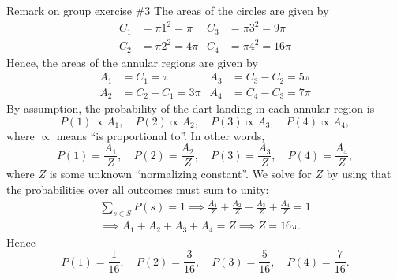 \documentclass[10pt]{beamer}
\begin{document}
\begin{frame}{Remark on group exercise \#3}
\footnotesize  
The areas of the circles are given by
%
\begin{align*}
C_1 &= \pi 1^2 = \pi   &  C_3 &= \pi 3^2 = 9 \pi  \\
C_2 &= \pi 2^2 = 4 \pi   &  C_4 &= \pi 4^2 = 16 \pi  
\end{align*}
%
Hence, the areas of the annular regions are given by 
%
\begin{align*}
A_1 &= C_1 = \pi  & A_3 &= C_3 - C_2 = 5 \pi  \\
A_2 &= C_2 - C_1 = 3 \pi  & A_4 &= C_4 - C_3 = 7 \pi  
\end{align*}
%
By assumption, the probability of the dart landing in each annular region is
\[ P(1) \propto A_1, \quad P(2) \propto A_2, \quad P(3) \propto A_3, \quad P(4) \propto A_4,\] 
where $\propto$ means \enquote{is proportional to}.  In other words,
\[ P(1) = \frac{A_1}{Z}, \quad P(2) = \frac{A_2}{Z}, \quad P(3) = \frac{A_3}{Z}, \quad P(4) = \frac{A_4}{Z},\]
where $Z$ is some unknown \enquote{normalizing constant}.  We solve for $Z$ by using that the probabilities over all outcomes must sum to unity: 
%
\begin{align*}
\sum_{s \in S} P(s) = 1  \implies \frac{A_1}{Z} + \frac{A_2}{Z} + \frac{A_3}{Z} + \frac{A_4}{Z}  = 1 \\
\implies A_1 + A_2 + A_3 + A_4 = Z  \implies Z = 16 \pi. 
\end{align*} 
%
Hence
\[ P(1) = \frac{1}{16}, \quad P(2) = \frac{3}{16}, \quad P(3) = \frac{5}{16}, \quad P(4) = \frac{7}{16}.\]
\end{frame}
\end{document}
